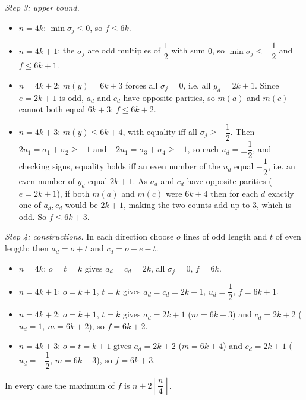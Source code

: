 \emph{Step 3: upper bound.}
\begin{itemize}
\item $n=4k$: $\min\sigma_j\le0$, so $f\le6k$.
\item $n=4k+1$: the $\sigma_j$ are odd multiples of $\dfrac12$ with sum $0$, so $\min\sigma_j\le-\dfrac12$ and $f\le6k+1$.
\item $n=4k+2$: $m(y)=6k+3$ forces all $\sigma_j=0$, i.e. all $y_d=2k+1$. Since $e=2k+1$ is odd, $a_d$ and $c_d$ have opposite parities, so $m(a)$ and $m(c)$ cannot both equal $6k+3$: $f\le6k+2$.
\item $n=4k+3$: $m(y)\le6k+4$, with equality iff all $\sigma_j\ge-\dfrac12$. Then $2u_1=\sigma_1+\sigma_2\ge-1$ and $-2u_1=\sigma_3+\sigma_4\ge-1$, so each $u_d=\pm\dfrac12$, and checking signs, equality holds iff an even number of the $u_d$ equal $-\dfrac12$, i.e. an even number of $y_d$ equal $2k+1$. As $a_d$ and $c_d$ have opposite parities ($e=2k+1$), if both $m(a)$ and $m(c)$ were $6k+4$ then for each $d$ exactly one of $a_d,c_d$ would be $2k+1$, making the two counts add up to $3$, which is odd. So $f\le6k+3$.
\end{itemize}

\emph{Step 4: constructions.} In each direction choose $o$ lines of odd length and $t$ of even length; then $a_d=o+t$ and $c_d=o+e-t$.
\begin{itemize}
\item $n=4k$: $o=t=k$ gives $a_d=c_d=2k$, all $\sigma_j=0$, $f=6k$.
\item $n=4k+1$: $o=k+1$, $t=k$ gives $a_d=c_d=2k+1$, $u_d=\dfrac12$, $f=6k+1$.
\item $n=4k+2$: $o=k+1$, $t=k$ gives $a_d=2k+1$ ($m=6k+3$) and $c_d=2k+2$ ($u_d=1$, $m=6k+2$), so $f=6k+2$.
\item $n=4k+3$: $o=t=k+1$ gives $a_d=2k+2$ ($m=6k+4$) and $c_d=2k+1$ ($u_d=-\dfrac12$, $m=6k+3$), so $f=6k+3$.
\end{itemize}
In every case the maximum of $f$ is $\boxed{n+2\left\lfloor\dfrac n4\right\rfloor}$.
